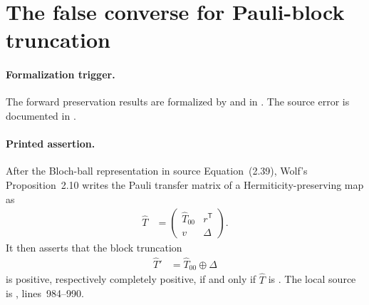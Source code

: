 \documentclass{article}
\begin{document}
\section{The false converse for Pauli-block truncation}
\label{sec:pauli-block-truncation}

\paragraph{Formalization trigger.}
The forward preservation results are formalized by
 and
 in
. The source
error is documented in
.

\paragraph{Printed assertion.}
After the Bloch-ball representation in source Equation~(2.39), Wolf's
Proposition~2.10 writes the Pauli transfer matrix of a
Hermiticity-preserving map as
\begin{align}
    \widehat T
        &=
        \begin{pmatrix}
            \widehat T_{00}&r^{\mathsf T}\\
            v&\Delta
        \end{pmatrix}.
    \label{eq:wolf_lecture_notes_errata_pauli_transfer_matrix}
\end{align}
It then asserts that the block truncation
\begin{align}
    \widehat T'
        &=\widehat T_{00}\oplus\Delta
    \label{eq:wolf_lecture_notes_errata_pauli_block_truncation}
\end{align}
is positive, respectively completely positive, if and only if $\widehat T$ is
\cite[Proposition~2.10]{Wolf2012Quantum}. The local source is
, lines~984--990.
\end{document}
